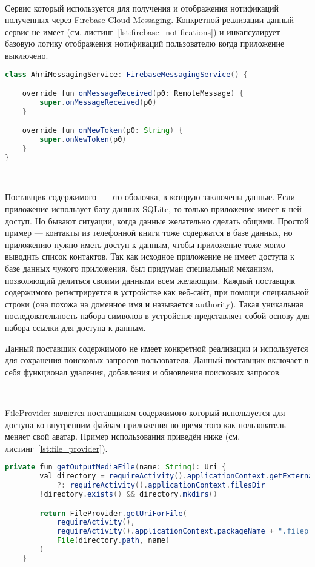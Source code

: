 ~\par

Сервис который используется для получения и отображения нотификаций полученных через Firebase Cloud Messaging. Конкретной реализации данный сервис не имеет (см. листинг~\ref{lst:firebase_notifications}) и инкапсулирует базовую логику отображения нотификаций пользователю когда приложение выключено.

\begin{lstlisting}[language=Java,label={lst:firebase_notifications},caption={AhriMessagingService}]
class AhriMessagingService: FirebaseMessagingService() {

    override fun onMessageReceived(p0: RemoteMessage) {
        super.onMessageReceived(p0)
    }

    override fun onNewToken(p0: String) {
        super.onNewToken(p0)
    }
}
\end{lstlisting}

~\par
Поставщик содержимого — это оболочка, в которую заключены данные. Если приложение использует базу данных SQLite, то только приложение имеет к ней доступ. Но бывают ситуации, когда данные желательно сделать общими. Простой пример — контакты из телефонной книги тоже содержатся в базе данных, но приложению нужно иметь доступ к данным, чтобы приложение тоже могло выводить список контактов. Так как исходное приложение не имеет доступа к базе данных чужого приложения, был придуман специальный механизм, позволяющий делиться своими данными всем желающим. Каждый поставщик содержимого регистрируется в устройстве как веб-сайт, при помощи специальной строки (она похожа на доменное имя и называется authority). Такая уникальная последовательность набора символов в устройстве представляет собой основу для набора ссылки для доступа к данным.

Данный поставщик содержимого не имеет конкретной реализации и используется для сохранения поисковых запросов пользователя. Данный поставщик включает в себя функционал удаления, добавления и обновления поисковых запросов.

~\par
FileProvider является поставщиком содержимого который используется для доступа ко внутренним файлам приложения во время того как пользователь меняет свой аватар. Пример использования приведён ниже (см. листинг~\ref{lst:file_provider}).

\begin{lstlisting}[language=Java,label={lst:file_provider},caption={Использование FileProvider}]
    private fun getOutputMediaFile(name: String): Uri {
        val directory = requireActivity().applicationContext.getExternalFilesDir(null)
            ?: requireActivity().applicationContext.filesDir
        !directory.exists() && directory.mkdirs()

        return FileProvider.getUriForFile(
            requireActivity(),
            requireActivity().applicationContext.packageName + ".fileprovider",
            File(directory.path, name)
        )
    }
\end{lstlisting}

